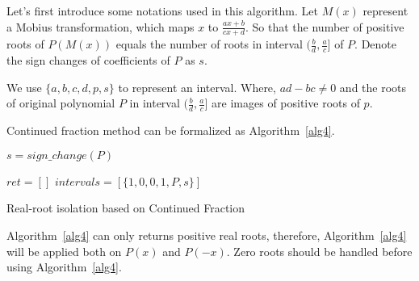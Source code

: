 Let's first introduce some notations used in this algorithm. Let $M(x)$
represent a Mobius transformation, which maps $x$ to $\frac{ax+b}{cx+d}$. So
that the number of positive roots of $P(M(x))$ equals the number of roots in
interval $(\frac{b}{d}, \frac{a}{c}]$ of $P$. Denote the sign changes of 
coefficients of $P$ as $s$.

We use $\{a,b,c,d,p, s\}$ to represent an interval. Where, $ad-bc \neq 0$ and the
roots of original polynomial $P$ in interval $(\frac{b}{d},\frac{a}{c}]$ are
images of positive roots of $p$.

Continued fraction method can be formalized as Algorithm~\ref{alg4}. 

\begin{algorithm}[H]
\label{alg4}
\SetAlgoLined


  $s = sign\_change(P)$\;

  $ret = []$\;
  $intervals = [\{1,0,0,1,P,s\}]$\;


  \;
\caption{Real-root isolation based on Continued Fraction}
\end{algorithm}

Algorithm~\ref{alg4} can only returns positive real roots, therefore,
Algorithm~\ref{alg4} will be applied both on $P(x)$ and $P(-x)$. Zero roots
should be handled before using Algorithm~\ref{alg4}. 
